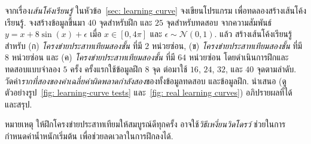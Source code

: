 \begin{Exercise}
\label{ex: learning curve}
จากเรื่อง\textit{เส้นโค้งเรียนรู้} ในหัวข้อ~\ref{sec: learning curve}
จงเขียนโปรแกรม
เพื่อทดลองสร้างเส้นโค้งเรียนรู้.
จงสร้างข้อมูลขึ้นมา $40$ จุดสำหรับฝึก
และ $25$ จุดสำหรับทดสอบ
จากความสัมพันธ์
$y = x + 8 \sin(x) + \epsilon$
เมื่อ $x \in [0, 4\pi]$
และ $\epsilon \sim \mathcal{N}(0,1)$.
แล้ว สร้างเส้นโค้งเรียนรู้สำหรับ
	(ก) \textit{โครงข่ายประสาทเทียมสองชั้น} ที่มี $2$ หน่วยซ่อน,
	(ข) \textit{โครงข่ายประสาทเทียมสองชั้น} ที่มี $8$ หน่วยซ่อน
	และ (ค)
	\textit{โครงข่ายประสาทเทียมสองชั้น} ที่มี $64$ หน่วยซ่อน
โดยดำเนินการฝึกและทดสอบแบบจำลอง $5$ ครั้ง
ครั้งแรกใช้ข้อมูลฝึก $8$ จุด
ต่อมาใช้ $16$, $24$, $32$, และ $40$ จุดตามลำดับ.
วัดค่า\textit{รากที่สองของค่าเฉลี่ยค่าผิดพลาดกำลังสอง}ของทั้งข้อมูลทดสอบ และข้อมูลฝึก. 
นำเสนอ (ดูตัวอย่างรูป~\ref{fig: learning-curve tests}
และ~\ref{fig: real learning curves})
อภิปรายผลที่ได้ และสรุป.

หมายเหตุ ให้ฝึกโครงข่ายประสาทเทียมให้สมบูรณ์ดีทุกครั้ง
อาจใช้\textit{วิธีเหงี่ยนวิดโดรว์} ช่วยในการกำหนดค่าน้ำหนักเริ่มต้น 
เพื่อช่วยลดเวลาในการฝึกลงได้.
\end{Exercise}

